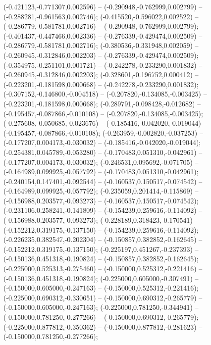  (-0.421123,-0.771307,0.002596) -- (-0.290948,-0.762999,0.002799) -- (-0.288281,-0.961563,0.002746);
 (-0.415520,-0.596022,0.002522) -- (-0.286779,-0.581781,0.002716) -- (-0.290948,-0.762999,0.002799);
 (-0.401437,-0.447466,0.002336) -- (-0.276339,-0.429474,0.002509) -- (-0.286779,-0.581781,0.002716);
 (-0.380536,-0.331948,0.002059) -- (-0.260945,-0.312846,0.002203) -- (-0.276339,-0.429474,0.002509);
 (-0.354975,-0.251101,0.001721) -- (-0.242278,-0.233290,0.001832) -- (-0.260945,-0.312846,0.002203);
 (-0.328601,-0.196752,0.000412) -- (-0.223201,-0.181598,0.000668) -- (-0.242278,-0.233290,0.001832);
 (-0.307152,-0.146800,-0.004518) -- (-0.207820,-0.134085,-0.003425) -- (-0.223201,-0.181598,0.000668);
 (-0.289791,-0.098428,-0.012682) -- (-0.195457,-0.087866,-0.010108) -- (-0.207820,-0.134085,-0.003425);
 (-0.275608,-0.050685,-0.023676) -- (-0.185416,-0.042020,-0.019044) -- (-0.195457,-0.087866,-0.010108);
 (-0.263959,-0.002820,-0.037253) -- (-0.177207,0.004173,-0.030032) -- (-0.185416,-0.042020,-0.019044);
 (-0.254381,0.045789,-0.053280) -- (-0.170483,0.051310,-0.042961) -- (-0.177207,0.004173,-0.030032);
 (-0.246531,0.095692,-0.071705) -- (-0.164989,0.099925,-0.057792) -- (-0.170483,0.051310,-0.042961);
 (-0.240154,0.147401,-0.092544) -- (-0.160537,0.150517,-0.074542) -- (-0.164989,0.099925,-0.057792);
 (-0.235059,0.201414,-0.115869) -- (-0.156988,0.203577,-0.093273) -- (-0.160537,0.150517,-0.074542);
 (-0.231106,0.258241,-0.141809) -- (-0.154239,0.259616,-0.114092) -- (-0.156988,0.203577,-0.093273);
 (-0.228189,0.318423,-0.170541) -- (-0.152212,0.319175,-0.137150) -- (-0.154239,0.259616,-0.114092);
 (-0.226235,0.382547,-0.202304) -- (-0.150857,0.382852,-0.162645) -- (-0.152212,0.319175,-0.137150);
 (-0.225197,0.451267,-0.237393) -- (-0.150136,0.451318,-0.190824) -- (-0.150857,0.382852,-0.162645);
 (-0.225000,0.525313,-0.275460) -- (-0.150000,0.525312,-0.221416) -- (-0.150136,0.451318,-0.190824);
 (-0.225000,0.605000,-0.307491) -- (-0.150000,0.605000,-0.247163) -- (-0.150000,0.525312,-0.221416);
 (-0.225000,0.690312,-0.330651) -- (-0.150000,0.690312,-0.265779) -- (-0.150000,0.605000,-0.247163);
 (-0.225000,0.781250,-0.344941) -- (-0.150000,0.781250,-0.277266) -- (-0.150000,0.690312,-0.265779);
 (-0.225000,0.877812,-0.350362) -- (-0.150000,0.877812,-0.281623) -- (-0.150000,0.781250,-0.277266);
